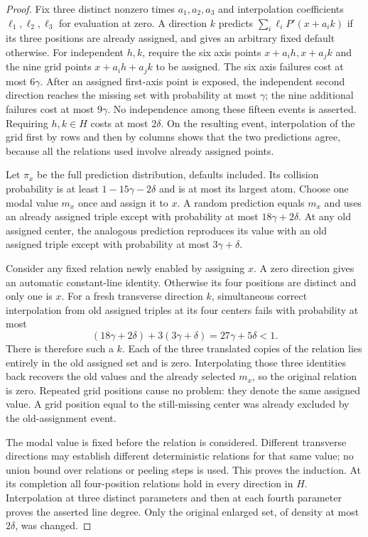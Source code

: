 \begin{proof}
Fix three distinct nonzero times $a_1,a_2,a_3$ and interpolation
coefficients $\ell_1,\ell_2,\ell_3$ for evaluation at zero. A direction
$k$ predicts $\sum_i\ell_iP'(x+a_i k)$ if its three positions are
already assigned, and gives an arbitrary fixed default otherwise.
For independent $h,k$, require the six axis points
$x+a_i h,x+a_j k$ and the nine grid points
$x+a_i h+a_j k$ to be assigned. The six axis failures cost at most
$6\gamma$. After an assigned first-axis point is exposed, the
independent second direction reaches the missing set with probability
at most $\gamma$; the nine additional failures cost at most
$9\gamma$. No independence among these fifteen events is asserted.
Requiring $h,k\in H$ costs at most $2\delta$.
On the resulting event, interpolation of the grid first by rows and
then by columns shows that the two predictions agree, because all
the relations used involve already assigned points.

Let $\pi_x$ be the full prediction distribution, defaults included.
Its collision probability is at least $1-15\gamma-2\delta$ and is
at most its largest atom. Choose one modal value $m_x$ once and
assign it to $x$. A random prediction equals $m_x$ and uses an
already assigned triple except with probability at most
$18\gamma+2\delta$. At any old assigned center, the analogous
prediction reproduces its value with an old assigned triple except
with probability at most $3\gamma+\delta$.

Consider any fixed relation newly enabled by assigning $x$. A zero
direction gives an automatic constant-line identity. Otherwise its
four positions are distinct and only one is $x$. For a fresh
transverse direction $k$, simultaneous correct interpolation from
old assigned triples at its four centers fails with probability at
most
\[
 (18\gamma+2\delta)+3(3\gamma+\delta)=27\gamma+5\delta<1.
\]
There is therefore such a $k$. Each of the three translated copies
of the relation lies entirely in the old assigned set and is zero.
Interpolating those three identities back recovers the old values
and the already selected $m_x$, so the original relation is zero.
Repeated grid positions cause no problem: they denote the same
assigned value. A grid position equal to the still-missing center
was already excluded by the old-assignment event.

The modal value is fixed before the relation is considered. Different
transverse directions may establish different deterministic
relations for that same value; no union bound over relations or
peeling steps is used. This proves the induction. At its completion
all four-position relations hold in every direction in $H$.
Interpolation at three distinct parameters and then at each fourth
parameter proves the asserted line degree. Only the original enlarged
set, of density at most $2\delta$, was changed.
\end{proof}

